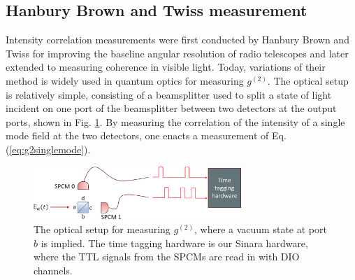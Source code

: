 \subsection{Hanbury Brown and Twiss measurement}

Intensity correlation measurements were first conducted by Hanbury Brown and Twiss for improving the baseline angular resolution of radio telescopes\cite{HANBURYBROWN1956} and later extended to measuring coherence in visible light\cite{brown1958interferometry}. Today, variations of their method is widely used in quantum optics for measuring $g^{(2)}$. The optical setup is relatively simple, consisting of a beamsplitter used to split a state of light incident on one port of the beamsplitter between two detectors at the output ports, shown in Fig. \ref{fig:hbtsetup}. By measuring the correlation of the intensity of a single mode field at the two detectors, one enacts a measurement of Eq. (\ref{eq:g2singlemode}).

\begin{figure}[!h]
    \centering
    \includegraphics[width=0.7\textwidth]{Images/hbt_measurment.pdf}
    \caption{The optical setup for measuring $g^{(2)}$, where a vacuum state at port $b$ is implied. The time tagging hardware is our Sinara hardware, where the TTL signals from the SPCMs are read in with DIO channels.}
    \label{fig:hbtsetup}
\end{figure}

